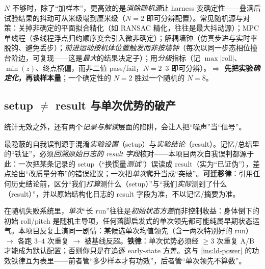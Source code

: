 \begin{insight}\label{ins:ld-determinize}
$N$ 不够时，除了“加样本”，更高效的是\emph{消除随机源}让 harness 变确定性——叠满后试验结果的抖动可从米级塌到厘米级（$N=2$ 即可分辨配置）。常见随机源与对策：关掉非确定的平面拟合精化（如 RANSAC 精化，往往是最大抖动源）；MPC 单线程（多线程浮点归约顺序变会引入微非确定）；解耦墙钟（仿真步进与实时率脱钩、避免丢步）；\emph{前进运动按机体位置触发而非按墙钟}（每次以同一步态相位撞台阶边，可复现——这是\emph{最大}的结果决定子）；用\emph{分级}指标（记 $\max|\mathrm{roll}|$、$\min(z)$、终点横偏，而非二值 pass/fail，$N=2\text{--}3$ 即可分辨）。\textbf{$\Rightarrow$ 先把实验\emph{确定化}，再谈样本量}；一个确定性的 $N=2$ 胜过一个随机的 $N=8$。
\end{insight}

\subsection{setup \texorpdfstring{$\ne$}{!=} result 与单次优势的破产}
\label{subsec:ld-setup-result}

统计无效之外，还有两个\emph{记录与解读}层面的陷阱，会让人把“噪声”当“信号”。

\begin{insight}\label{ins:ld-setup-result}
最隐蔽的自我误判源于混淆\emph{实验设置}（setup）与\emph{实验结论}（result）。记忆/总结里的“铁证”，必须\emph{回溯原始日志的 result 字段}核对——本项目两次自我误判都源于此：一次把某条记录的 setup（“换惯量\emph{测试}”）误读成 result（实为“已证伪”），差点给出“改质量分布”的错误建议；一次把\emph{单次}爬升当成“突破”。\textbf{可迁移律}：引用任何历史结论前，区分“我们\emph{打算}测什么（setup）”与“我们\emph{实际}测到了什么（result）”，并以原始结构化日志的 result 字段为准，不以记忆/摘要为准。
\end{insight}

\begin{insight}\label{ins:ld-repeat}
在随机失败系统里，\emph{单次}“长 run”往往是\emph{初始状态方差}而非控制收益：身体倒下的初始 roll/pitch 是随机主导项，任何落脚启发式的单次领先都可能纯属早期状态运气。本项目反复上演同一剧情：某候选单次均值领先（含一两次特别好的 run）$\to$ 各跑 $3\text{--}4$ 次重复 $\to$ 被基线反超。\textbf{铁律}：单次优势必须经 $\ge 3$ 次重复 A/B 才能成为默认配置；否则你只是在追逐 early-state 方差。这与 \cref{ins:ld-power} 的功效铁律互为表里——前者管“多少样本才有功效”，后者管“单次领先不算数”。
\end{insight}

